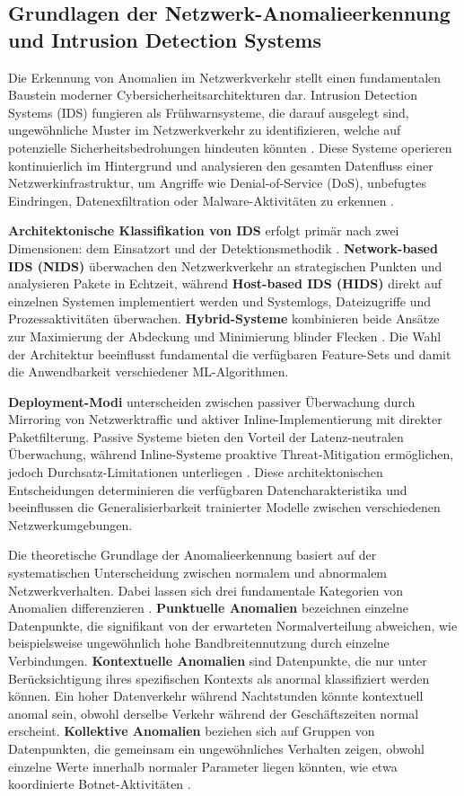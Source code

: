 \documentclass[11pt,a4paper]{article}
\begin{document}
    \subsection{Grundlagen der Netzwerk-Anomalieerkennung und Intrusion Detection Systems}

    Die Erkennung von Anomalien im Netzwerkverkehr stellt einen fundamentalen Baustein moderner Cybersicherheitsarchitekturen dar. Intrusion Detection Systems (IDS) fungieren als Frühwarnsysteme, die darauf ausgelegt sind, ungewöhnliche Muster im Netzwerkverkehr zu identifizieren, welche  auf potenzielle Sicherheitsbedrohungen hindeuten könnten \parencite{Ring2019}. Diese Systeme operieren kontinuierlich im Hintergrund und analysieren den gesamten Datenfluss einer Netzwerkinfrastruktur, um Angriffe wie Denial-of-Service (DoS), unbefugtes Eindringen, Datenexfiltration oder Malware-Aktivitäten zu erkennen \parencite{Vinayakumar2019}.

    \textbf{Architektonische Klassifikation von IDS} erfolgt primär nach zwei Dimensionen: dem Einsatzort und der Detektionsmethodik \parencite{Ring2019}. \textbf{Network-based IDS (NIDS)} überwachen den Netzwerkverkehr an strategischen Punkten und analysieren Pakete in Echtzeit, während \textbf{Host-based IDS (HIDS)} direkt auf einzelnen Systemen implementiert werden und Systemlogs, Dateizugriffe und Prozessaktivitäten überwachen. \textbf{Hybrid-Systeme} kombinieren beide Ansätze zur Maximierung der Abdeckung und Minimierung blinder Flecken \parencite{Gharib2016}. Die Wahl der Architektur beeinflusst fundamental die verfügbaren Feature-Sets und damit die Anwendbarkeit verschiedener ML-Algorithmen.

    \textbf{Deployment-Modi} unterscheiden zwischen passiver Überwachung durch Mirroring von Netzwerktraffic und aktiver Inline-Implementierung mit direkter Paketfilterung. Passive Systeme bieten den Vorteil der Latenz-neutralen Überwachung, während Inline-Systeme proaktive Threat-Mitigation ermöglichen, jedoch Durchsatz-Limitationen unterliegen \parencite{Vinayakumar2019}. Diese architektonischen Entscheidungen determinieren die verfügbaren Datencharakteristika und beeinflussen die Generalisierbarkeit trainierter Modelle zwischen verschiedenen Netzwerkumgebungen.

    Die theoretische Grundlage der Anomalieerkennung basiert auf der systematischen Unterscheidung zwischen normalem und abnormalem Netzwerkverhalten. Dabei lassen sich drei fundamentale Kategorien von Anomalien differenzieren \parencite{Ring2019}. \textbf{Punktuelle Anomalien} bezeichnen einzelne Datenpunkte, die signifikant von der erwarteten Normalverteilung abweichen, wie beispielsweise ungewöhnlich hohe Bandbreitennutzung durch einzelne Verbindungen. \textbf{Kontextuelle Anomalien} sind Datenpunkte, die nur unter Berücksichtigung ihres spezifischen Kontexts als anormal klassifiziert werden können. Ein hoher Datenverkehr während Nachtstunden könnte kontextuell anomal sein, obwohl derselbe Verkehr während der Geschäftszeiten normal erscheint. \textbf{Kollektive Anomalien} beziehen sich auf Gruppen von Datenpunkten, die gemeinsam ein ungewöhnliches Verhalten zeigen, obwohl einzelne Werte innerhalb normaler Parameter liegen könnten, wie etwa koordinierte Botnet-Aktivitäten \parencite{Ring2019}.
\end{document}
